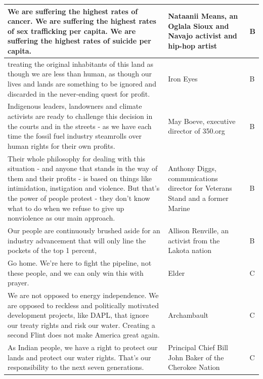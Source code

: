 \begin{footnotesize}
\begin{spacing}{1}
\begin{longtable}{| p{} | P{.25\textwidth} | p{.07\textwidth}|}
We are suffering the highest rates of cancer. We are suffering the highest rates of sex trafficking per capita. We are suffering the highest rates of suicide per capita.                                                                                 & Nataanii Means, an Oglala Sioux and Navajo activist and hip-hop artist                                         & B              \\ \hline
treating the original inhabitants of this land as though we are less than human, as though our lives and lands are something to be ignored and discarded in the never-ending quest for profit.                                                            & Iron Eyes                                    & B              \\ \hline
Indigenous leaders, landowners and climate activists are ready to challenge this decision in the courts and in the streets - as we have each time the fossil fuel industry steamrolls over human rights for their own profits.                            & May Boeve, executive director of 350.org     & B              \\ \hline
Their whole philosophy for dealing with this situation - and anyone that stands in the way of them and their profits - is based on things like intimidation, instigation and violence. But that's the power of people protest - they don't know what to do when we refuse to give up nonviolence as our main approach.      & Anthony Diggs, communications director for Veterans Stand and a former Marine                                  & B              \\ \hline
Our people are continuously brushed aside for an industry advancement that will only line the pockets of the top 1 percent,                                           & Allison Renville, an activist from the Lakota nation                                                           & B              \\ \hline
Go home. We're here to fight the pipeline, not these people, and we can only win this with prayer.                                                                    & Elder                                        & C              \\ \hline
We are not opposed to energy independence. We are opposed to reckless and politically motivated development projects, like DAPL, that ignore our treaty rights and risk our water. Creating a second Flint does not make America great again. & Archambault  & C    \\ \hline
As Indian people, we have a right to protect our lands and protect our water rights. That's our responsibility to the next seven generations.                         & Principal Chief Bill John Baker of the Cherokee Nation                                                         & C              \\ \hline

\end{longtable}
\end{spacing}
\end{footnotesize}
